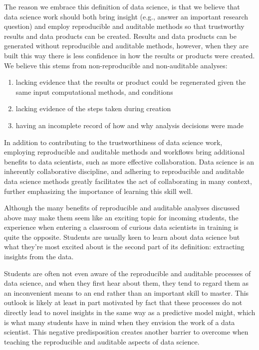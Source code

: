 \documentclass[
  12 pt,
]{paper}
\providecommand{\tightlist}{%
  \setlength{\itemsep}{0pt}\setlength{\parskip}{0pt}}
\begin{document}
The reason we embrace this definition of data science,
is that we believe that data science work should both bring insight
(e.g., answer an important research question)
and employ reproducible and auditable methods
so that trustworthy results and data products can be created.
Results and data products can be generated
without reproducible and auditable methods,
however,
when they are built this way there is less confidence
in how the results or products were created.
We believe this stems from non-reproducible and non-auditable analyses:

\begin{enumerate}
\def\labelenumi{\arabic{enumi}.}
\tightlist
\item
  lacking evidence that the results or product could be regenerated given the same input computational methods, and conditions
\item
  lacking evidence of the steps taken during creation
\item
  having an incomplete record of how and why analysis decisions were made
\end{enumerate}

In addition to contributing to the trustworthiness of data science work,
employing reproducible and auditable methods and workflows
bring additional benefits to data scientists,
such as more effective collaboration.
Data science is an inherently collaborative discipline,
and adhering to reproducible and auditable data science methods
greatly facilitates the act of collaborating in many context,
further emphasizing the importance of learning this skill well.

Although the many benefits of reproducible and auditable analyses discussed above
may make them seem like an exciting topic for incoming students,
the experience when entering a classroom of curious data scientists in training
is quite the opposite.
Students are usually keen to learn about data science
but what they're most excited about is the second part of
its definition: extracting insights from the data.

Students are often not even aware of the reproducible
and auditable processes of data science,
and when they first hear about them,
they tend to regard them as an inconvenient means to an end
rather than an important skill to master.
This outlook is likely at least in part motivated by fact that these processes
do not directly lead to novel insights
in the same way as a predictive model might,
which is what many students have in mind when they envision the work of a data scientist.
This negative predisposition creates another barrier to overcome
when teaching the reproducible and auditable aspects of data science.
\end{document}
